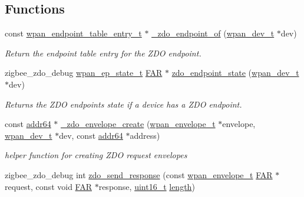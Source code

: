 \subsection*{Functions}
\begin{DoxyCompactItemize}
\item 
const \hyperlink{structwpan__endpoint__table__entry__t}{wpan\+\_\+endpoint\+\_\+table\+\_\+entry\+\_\+t} $\ast$ \hyperlink{group__zdo_gab405baf051b6c2b3c85bc4e80aa5c2bb}{\+\_\+zdo\+\_\+endpoint\+\_\+of} (\hyperlink{structwpan__dev__t}{wpan\+\_\+dev\+\_\+t} $\ast$dev)
\begin{DoxyCompactList}\small\item\em Return the endpoint table entry for the Z\+DO endpoint. \end{DoxyCompactList}\item 
zigbee\+\_\+zdo\+\_\+debug \hyperlink{structwpan__ep__state__t}{wpan\+\_\+ep\+\_\+state\+\_\+t} \hyperlink{group__hal_gaef060b3456fdcc093a7210a762d5f2ed}{F\+AR} $\ast$ \hyperlink{group__zdo_gaaf992619b06595291c2aead8a3d4dba1}{zdo\+\_\+endpoint\+\_\+state} (\hyperlink{structwpan__dev__t}{wpan\+\_\+dev\+\_\+t} $\ast$dev)
\begin{DoxyCompactList}\small\item\em Returns the Z\+DO endpoint\textquotesingle{}s state if a device has a Z\+DO endpoint. \end{DoxyCompactList}\item 
const \hyperlink{unionaddr64}{addr64} $\ast$ \hyperlink{group__zdo_gae4b6736d215caf2a10790761ed52443d}{\+\_\+zdo\+\_\+envelope\+\_\+create} (\hyperlink{structwpan__envelope__t}{wpan\+\_\+envelope\+\_\+t} $\ast$envelope, \hyperlink{structwpan__dev__t}{wpan\+\_\+dev\+\_\+t} $\ast$dev, const \hyperlink{unionaddr64}{addr64} $\ast$address)
\begin{DoxyCompactList}\small\item\em helper function for creating Z\+DO request envelopes \end{DoxyCompactList}\item 
zigbee\+\_\+zdo\+\_\+debug int \hyperlink{group__zdo_ga1d645805a731e1419b5012a5c8a09bf8}{zdo\+\_\+send\+\_\+response} (const \hyperlink{structwpan__envelope__t}{wpan\+\_\+envelope\+\_\+t} \hyperlink{group__hal_gaef060b3456fdcc093a7210a762d5f2ed}{F\+AR} $\ast$request, const void \hyperlink{group__hal_gaef060b3456fdcc093a7210a762d5f2ed}{F\+AR} $\ast$response, \hyperlink{group__hal__dos_ga5a8b2dc9e45a9ee81a94ef304fb62505}{uint16\+\_\+t} \hyperlink{group__zdo_gab2b3adeb2a67e656ff030b56727fd0ac}{length})

\end{DoxyCompactItemize}
